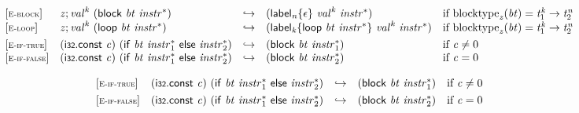 \documentclass[a4paper]{scrartcl}
\begin{document}
$$
\begin{array}{@{}l@{}lcl@{}l@{}}
{[\textsc{\scriptsize E{-}block}]} \quad & {\mathit{z}} ; {{\mathit{val}}^{{\mathit{k}}}}~(\mathsf{block}~{\mathit{bt}}~{{\mathit{instr}}^\ast}) &\hookrightarrow& ({{\mathsf{label}}_{{\mathit{n}}}}{\{\epsilon\}}~{{\mathit{val}}^{{\mathit{k}}}}~{{\mathit{instr}}^\ast}) &\quad
  \mbox{if}~{{\mathrm{blocktype}}}_{{\mathit{z}}}({\mathit{bt}}) = {{\mathit{t}}_{{1}}^{{\mathit{k}}}} \rightarrow {{\mathit{t}}_{{2}}^{{\mathit{n}}}} \\
{[\textsc{\scriptsize E{-}loop}]} \quad & {\mathit{z}} ; {{\mathit{val}}^{{\mathit{k}}}}~(\mathsf{loop}~{\mathit{bt}}~{{\mathit{instr}}^\ast}) &\hookrightarrow& ({{\mathsf{label}}_{{\mathit{k}}}}{\{\mathsf{loop}~{\mathit{bt}}~{{\mathit{instr}}^\ast}\}}~{{\mathit{val}}^{{\mathit{k}}}}~{{\mathit{instr}}^\ast}) &\quad
  \mbox{if}~{{\mathrm{blocktype}}}_{{\mathit{z}}}({\mathit{bt}}) = {{\mathit{t}}_{{1}}^{{\mathit{k}}}} \rightarrow {{\mathit{t}}_{{2}}^{{\mathit{n}}}} \\[0.8ex]
{[\textsc{\scriptsize E{-}if{-}true}]} \quad & (\mathsf{i{\scriptstyle32}}.\mathsf{const}~{\mathit{c}})~(\mathsf{if}~{\mathit{bt}}~{{\mathit{instr}}_{{1}}^\ast}~\mathsf{else}~{{\mathit{instr}}_{{2}}^\ast}) &\hookrightarrow& (\mathsf{block}~{\mathit{bt}}~{{\mathit{instr}}_{{1}}^\ast}) &\quad
  \mbox{if}~{\mathit{c}} \neq 0 \\
{[\textsc{\scriptsize E{-}if{-}false}]} \quad & (\mathsf{i{\scriptstyle32}}.\mathsf{const}~{\mathit{c}})~(\mathsf{if}~{\mathit{bt}}~{{\mathit{instr}}_{{1}}^\ast}~\mathsf{else}~{{\mathit{instr}}_{{2}}^\ast}) &\hookrightarrow& (\mathsf{block}~{\mathit{bt}}~{{\mathit{instr}}_{{2}}^\ast}) &\quad
  \mbox{if}~{\mathit{c}} = 0 \\
\end{array}
$$

$$
\begin{array}{@{}l@{}lcl@{}l@{}}
{[\textsc{\scriptsize E{-}if{-}true}]} \quad & (\mathsf{i{\scriptstyle32}}.\mathsf{const}~{\mathit{c}})~(\mathsf{if}~{\mathit{bt}}~{{\mathit{instr}}_{{1}}^\ast}~\mathsf{else}~{{\mathit{instr}}_{{2}}^\ast}) &\hookrightarrow& (\mathsf{block}~{\mathit{bt}}~{{\mathit{instr}}_{{1}}^\ast}) &\quad
  \mbox{if}~{\mathit{c}} \neq 0 \\[0.8ex]
{[\textsc{\scriptsize E{-}if{-}false}]} \quad & (\mathsf{i{\scriptstyle32}}.\mathsf{const}~{\mathit{c}})~(\mathsf{if}~{\mathit{bt}}~{{\mathit{instr}}_{{1}}^\ast}~\mathsf{else}~{{\mathit{instr}}_{{2}}^\ast}) &\hookrightarrow& (\mathsf{block}~{\mathit{bt}}~{{\mathit{instr}}_{{2}}^\ast}) &\quad
  \mbox{if}~{\mathit{c}} = 0 \\
\end{array}
$$
\end{document}
